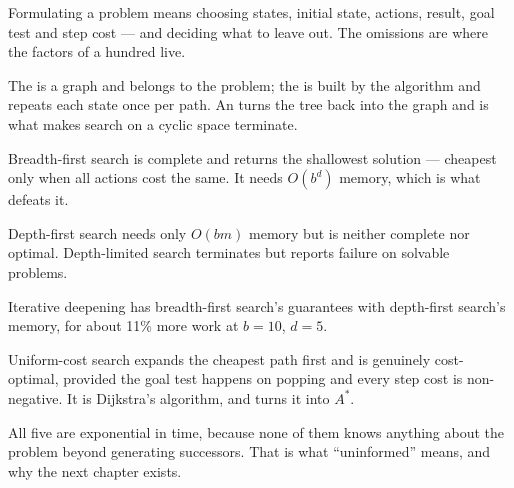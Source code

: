 \begin{chaptersummary}
\begin{tight}
  \item Formulating a problem means choosing states, initial state, actions,
        result, goal test and step cost --- and deciding what to leave out. The
        omissions are where the factors of a hundred live.
  \item The  is a graph and belongs to the problem; the
         is built by the algorithm and repeats each state once
        per path. An  turns the tree back into the graph and is
        what makes search on a cyclic space terminate.
  \item Breadth-first search is complete and returns the shallowest solution ---
        cheapest only when all actions cost the same. It needs $O(b^{d})$ memory,
        which is what defeats it.
  \item Depth-first search needs only $O(bm)$ memory but is neither complete nor
        optimal. Depth-limited search terminates but reports failure on solvable
        problems.
  \item Iterative deepening has breadth-first search's guarantees with depth-first
        search's memory, for about 11\% more work at $b=10$, $d=5$.
  \item Uniform-cost search expands the cheapest path first and is genuinely
        cost-optimal, provided the goal test happens on popping and every step cost
        is non-negative. It is Dijkstra's algorithm, and  turns it
        into $A^{*}$.
  \item All five are exponential in time, because none of them knows anything about
        the problem beyond generating successors. That is what ``uninformed''
        means, and why the next chapter exists.
\end{tight}
\end{chaptersummary}

